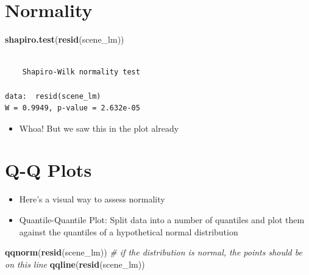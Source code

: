\documentclass[]{article}
\newenvironment{Shaded}{}{}
\newcommand{\KeywordTok}[1]{\textcolor[rgb]{0.00,0.44,0.13}{\textbf{{#1}}}}
\newcommand{\CommentTok}[1]{\textcolor[rgb]{0.38,0.63,0.69}{\textit{{#1}}}}
\newcommand{\NormalTok}[1]{{#1}}
\begin{document}
\section{Normality}\label{normality}

\begin{Shaded}
\begin{Highlighting}[]
\KeywordTok{shapiro.test}\NormalTok{(}\KeywordTok{resid}\NormalTok{(scene_lm))}
\end{Highlighting}
\end{Shaded}

\begin{verbatim}

    Shapiro-Wilk normality test

data:  resid(scene_lm)
W = 0.9949, p-value = 2.632e-05
\end{verbatim}

\begin{itemize}
\itemsep1pt\parskip0pt
\item
  Whoa! But we saw this in the plot already
\end{itemize}

\section{Q-Q Plots}\label{q-q-plots}

\begin{itemize}
\itemsep1pt\parskip0pt
\item
  Here's a visual way to assess normality
\item
  Quantile-Quantile Plot: Split data into a number of quantiles and plot
  them against the quantiles of a hypothetical normal distribution
\end{itemize}

\begin{Shaded}
\begin{Highlighting}[]
\KeywordTok{qqnorm}\NormalTok{(}\KeywordTok{resid}\NormalTok{(scene_lm))}
\CommentTok{# if the distribution is normal, the points should be on this line}
\KeywordTok{qqline}\NormalTok{(}\KeywordTok{resid}\NormalTok{(scene_lm))}
\end{Highlighting}
\end{Shaded}
\end{document}
